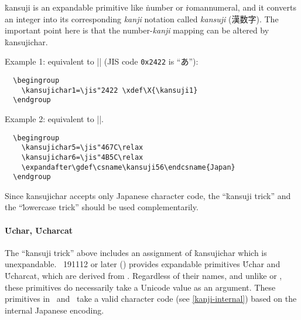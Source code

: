 \documentclass[a4paper,11pt,dvipdfmx]{article}
\let\emph=\origemph
\def\code#1{\texttt{#1}}
\def\Foreign#1{\textit{#1}}
\begin{document}
\.{kansuji} is an expandable primitive like \.{number} or \.{romannumeral},
and it converts an integer into its corresponding \Foreign{kanji} notation
called \Foreign{kansuji} (漢数字). The important point here is that
the number-\Foreign{kanji} mapping can be altered by \.{kansujichar}.

Example 1: equivalent to |\def\X{あ}| (JIS code \code{0x2422} is ``あ''):
\begin{verbatim}
  \begingroup
    \kansujichar1=\jis"2422 \xdef\X{\kansuji1}
  \endgroup
\end{verbatim}

Example 2: equivalent to |\def\日本{Japan}|.
\begin{verbatim}
  \begingroup
    \kansujichar5=\jis"467C\relax
    \kansujichar6=\jis"4B5C\relax
    \expandafter\gdef\csname\kansuji56\endcsname{Japan}
  \endgroup
\end{verbatim}

Since \.{kansujichar} accepts only Japanese character code,
the ``\.{kansuji} trick'' and the ``\.{lowercase} trick'' should be
used complementarily.

\paragraph{\.{Uchar}, \.{Ucharcat}}
The ``\.{kansuji} trick'' above includes an assignment of \.{kansujichar}
which is unexpandable.
\epTeX~191112 or later () provides expandable primitives
\.{Uchar} and \.{Ucharcat}, which are derived from .
Regardless of their names, and unlike  or ,
these primitives do \emph{not} necessarily take
a Unicode value as an argument.
These primitives in \epTeX\ and \eupTeX\ take a valid character code
(see \ref{kanji-internal}) based on the internal Japanese encoding.
\end{document}
